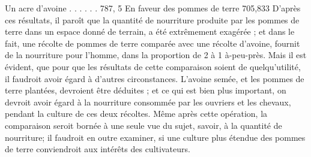 Un acre d'avoine . . . . . . 787, 5
En faveur des pommes de terre 705,833
D'après ces résultats, il paroît que la quantité de nourriture produite par les pommes de terre dans un espace donné de terrain, a été extrêmement exagérée ; et dans le fait, une récolte de pommes de terre comparée avec une récolte d'avoine, fournit de la nourriture pour l'homme, dans la proportion de 2 à 1 à-peu-près. Mais il est évident, que pour que les résultats de cette comparaison soient de quelqu'utilité, il faudroit avoir égard à d'autres circonstances. L'avoine semée, et les pommes de terre plantées, devroient être déduites ; et ce qui est bien plus important, on devroit\setcounter{page}{362} avoir égard à la nourriture consommée par les ouvriers et les chevaux, pendant la culture de ces deux récoltes. Même après cette opération, la comparaison seroit bornée à une seule vue du sujet, savoir, à la quantité de nourriture; il faudroit en outre examiner, si une culture plus étendue des pommes de terre conviendroit aux intérêts des cultivateurs.